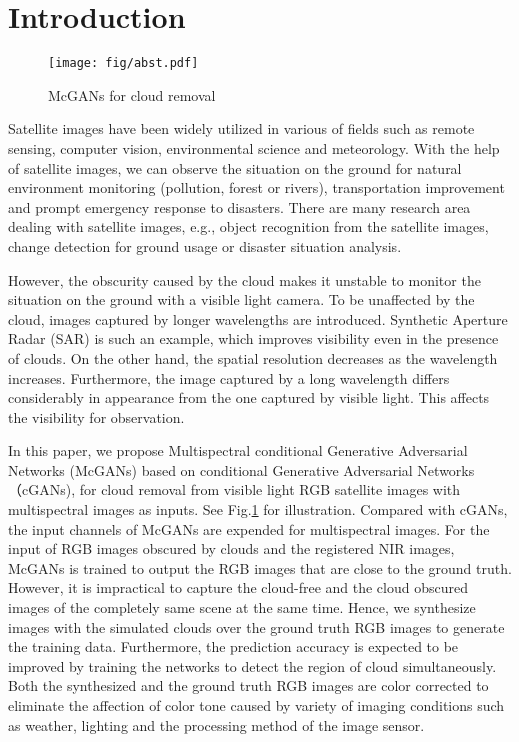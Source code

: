 \documentclass[10pt,twocolumn,letterpaper]{article}
\begin{document}
\section{Introduction}

\begin{figure}[!t]
\begin{center}
\hspace*{0mm}\texttt{[image: fig/abst.pdf]}
\caption{McGANs for cloud removal}
\label{fig:abst}
\end{center}
\end{figure}

Satellite images have been widely utilized in various of fields such as remote sensing, computer vision, environmental science and meteorology.
With the help of satellite images, we can observe the situation on the ground for natural environment monitoring (pollution, forest or rivers), transportation improvement and prompt emergency response to disasters.
There are many research area dealing with satellite images, e.g., object recognition from the satellite images, change detection for ground usage or disaster situation analysis.

However, the obscurity caused by the cloud makes it unstable to monitor the situation on the ground with a visible light camera. To be unaffected by the cloud, images captured by longer wavelengths are introduced. Synthetic Aperture Radar (SAR) \cite{furuta_sar_color} is such an example, which improves visibility even in the presence of clouds. On the other hand, the spatial resolution decreases as the wavelength increases. Furthermore, the image captured by a long wavelength differs considerably in appearance from the one captured by visible light. This affects the visibility for observation.

In this paper, we propose Multispectral conditional Generative Adversarial Networks (McGANs) based on conditional Generative Adversarial Networks（cGANs), for cloud removal from visible light RGB satellite images with multispectral images as inputs. See Fig.\ref{fig:abst} for illustration. Compared with cGANs, the input channels of McGANs are expended for multispectral images. For the input of RGB images obscured by clouds and the registered NIR images, McGANs is trained to output the RGB images that are close to the ground truth. However, it is impractical to capture the cloud-free and the cloud obscured images of the completely same scene at the same time. Hence, we synthesize images with the simulated clouds over the ground truth RGB images to generate the training data. Furthermore, the prediction accuracy is expected to be improved by training the networks to detect the region of cloud simultaneously. Both the synthesized and the ground truth RGB images are color corrected to eliminate the affection of color tone caused by variety of imaging conditions such as weather, lighting and the processing method of the image sensor. 
\end{document}
